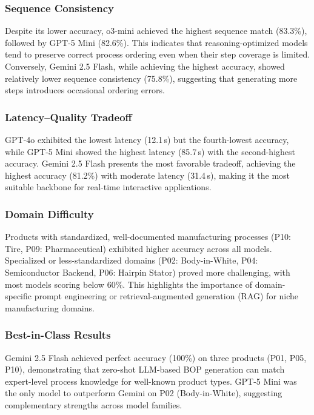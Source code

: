 \subsubsection{Sequence Consistency}

Despite its lower accuracy, o3-mini achieved the highest sequence match (83.3\%), followed by GPT-5 Mini (82.6\%).
This indicates that reasoning-optimized models tend to preserve correct process ordering even when their step coverage is limited.
Conversely, Gemini 2.5 Flash, while achieving the highest accuracy, showed relatively lower sequence consistency (75.8\%), suggesting that generating more steps introduces occasional ordering errors.

\subsubsection{Latency--Quality Tradeoff}

GPT-4o exhibited the lowest latency (12.1\,s) but the fourth-lowest accuracy, while GPT-5 Mini showed the highest latency (85.7\,s) with the second-highest accuracy.
Gemini 2.5 Flash presents the most favorable tradeoff, achieving the highest accuracy (81.2\%) with moderate latency (31.4\,s), making it the most suitable backbone for real-time interactive applications.

\subsubsection{Domain Difficulty}

Products with standardized, well-documented manufacturing processes (P10: Tire, P09: Pharmaceutical) exhibited higher accuracy across all models.
Specialized or less-standardized domains (P02: Body-in-White, P04: Semiconductor Backend, P06: Hairpin Stator) proved more challenging, with most models scoring below 60\%.
This highlights the importance of domain-specific prompt engineering or retrieval-augmented generation (RAG) for niche manufacturing domains.

\subsubsection{Best-in-Class Results}

Gemini 2.5 Flash achieved perfect accuracy (100\%) on three products (P01, P05, P10), demonstrating that zero-shot LLM-based BOP generation can match expert-level process knowledge for well-known product types.
GPT-5 Mini was the only model to outperform Gemini on P02 (Body-in-White), suggesting complementary strengths across model families.
